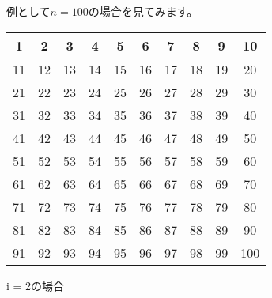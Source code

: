 \documentclass{jlreq}
\begin{document}
例として$n = 100$の場合を見てみます。

\vspace{0.5cm}

\begin{center}
  \begin{tabular}{|c|c|c|c|c|c|c|c|c|c|}
      \hline
      1  & 2  & 3  & 4  & 5  & 6  & 7  & 8  & 9  & 10 \\ \hline
      11 & 12 & 13 & 14 & 15 & 16 & 17 & 18 & 19 & 20 \\ \hline
      21 & 22 & 23 & 24 & 25 & 26 & 27 & 28 & 29 & 30 \\ \hline
      31 & 32 & 33 & 34 & 35 & 36 & 37 & 38 & 39 & 40 \\ \hline
      41 & 42 & 43 & 44 & 45 & 46 & 47 & 48 & 49 & 50 \\ \hline
      51 & 52 & 53 & 54 & 55 & 56 & 57 & 58 & 59 & 60 \\ \hline
      61 & 62 & 63 & 64 & 65 & 66 & 67 & 68 & 69 & 70 \\ \hline
      71 & 72 & 73 & 74 & 75 & 76 & 77 & 78 & 79 & 80 \\ \hline
      81 & 82 & 83 & 84 & 85 & 86 & 87 & 88 & 89 & 90 \\ \hline
      91 & 92 & 93 & 94 & 95 & 96 & 97 & 98 & 99 & 100 \\ \hline
  \end{tabular}

\end{center}
\vspace{0.1cm}


\begin{center}
    i = 2の場合
\end{center}

\vspace{0.5cm}
\end{document}

